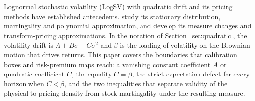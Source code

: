 \documentclass[11pt,a4paper]{article}
\theoremstyle{definition}
\theoremstyle{remark}
\begin{document}
Lognormal stochastic volatility (LogSV) with quadratic drift and its pricing methods have established antecedents. \citet{CarrWillems2019} study its stationary distribution, martingality and polynomial approximation, and \citet{SeppRakhmonovLogSV} develop its measure changes and transform-pricing approximations. In the notation of Section~\ref{sec:quadratic}, the volatility drift is $A+B\sigma-C\sigma^2$ and $\beta$ is the loading of volatility on the Brownian motion that drives returns. This paper covers the boundaries that calibration boxes and risk-premium maps reach: a vanishing constant coefficient $A$ or quadratic coefficient $C$, the equality $C=\beta$, the strict expectation defect for every horizon when $C<\beta$, and the two inequalities that separate validity of the physical-to-pricing density from stock martingality under the resulting measure.
\end{document}
